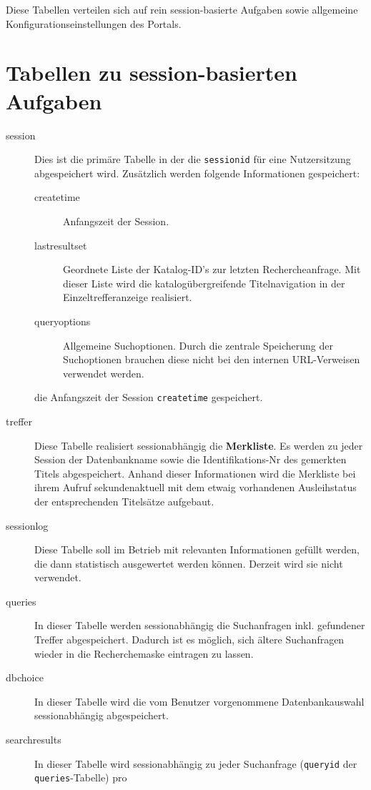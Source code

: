 \documentclass[11pt, twoside, a4paper, BCOR8mm, DIV12, bibtotoc,idxtotoc]{scrbook}
\begin{document}
Diese Tabellen verteilen sich auf rein session-basierte Aufgaben sowie
allgemeine Konfigurations\-ein\-stellungen des Portals.


\section{Tabellen zu session-basierten Aufgaben}

\begin{description}
\item[session] Dies ist die primäre Tabelle in der die
  \texttt{sessionid} für eine Nutzersitzung abgespeichert wird.
  Zusätzlich werden folgende Informationen gespeichert:
  \begin{description}
  \item[createtime] Anfangszeit der Session.
  \item[lastresultset] Geordnete Liste der Katalog-ID's zur letzten
    Rechercheanfrage. Mit dieser Liste wird die katalogübergreifende
    Titelnavigation in der Einzeltrefferanzeige realisiert.
  \item[queryoptions] Allgemeine Suchoptionen. Durch die zentrale Speicherung der
    Suchoptionen brauchen diese nicht bei den internen URL-Verweisen
    verwendet werden.
  \end{description}
die Anfangszeit der Session \texttt{createtime}
  gespeichert. 
\item[treffer] Diese Tabelle realisiert sessionabhängig die
  \textbf{Merkliste}. Es werden zu jeder Session der Datenbankname sowie die
  Identifikations-Nr des gemerkten Titels abgespeichert. Anhand dieser
  Informationen wird die Merkliste bei ihrem Aufruf sekundenaktuell
  mit dem etwaig vorhandenen Ausleihstatus der entsprechenden
  Titelsätze aufgebaut.
\item[sessionlog] Diese Tabelle soll im Betrieb mit relevanten
  Informationen gefüllt werden, die dann statistisch ausgewertet
  werden können. Derzeit wird sie nicht verwendet.
\item[queries] In dieser Tabelle werden sessionabhängig die
  Suchanfragen inkl. gefundener Treffer ab\-ge\-spei\-chert. Dadurch ist es
  möglich, sich ältere Suchanfragen wieder in die Recherchemaske
  eintragen zu lassen.
\item[dbchoice] In dieser Tabelle wird die vom Benutzer vorgenommene
  Datenbankauswahl session\-ab\-hängig abgespeichert.
\item[searchresults] In dieser Tabelle wird session\-ab\-hän\-gig zu jeder
  Suchanfrage (\texttt{queryid} der \texttt{queries}-Tabelle) pro

\end{description}
\end{document}
